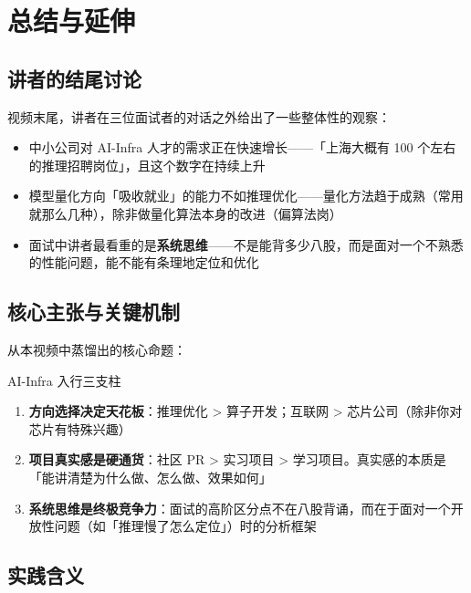 \documentclass[a4paper]{article}
\begin{document}
\section{总结与延伸}

\subsection{讲者的结尾讨论}

视频末尾，讲者在三位面试者的对话之外给出了一些整体性的观察：

\begin{itemize}
  \item 中小公司对 AI-Infra 人才的需求正在快速增长——「上海大概有 100 个左右的推理招聘岗位」，且这个数字在持续上升
  \item 模型量化方向「吸收就业」的能力不如推理优化——量化方法趋于成熟（常用就那么几种），除非做量化算法本身的改进（偏算法岗）
  \item 面试中讲者最看重的是\textbf{系统思维}——不是能背多少八股，而是面对一个不熟悉的性能问题，能不能有条理地定位和优化
\end{itemize}

\subsection{核心主张与关键机制}

从本视频中蒸馏出的核心命题：

\begin{importantbox}{AI-Infra 入行三支柱}
  \begin{enumerate}
    \item \textbf{方向选择决定天花板}：推理优化 > 算子开发；互联网 > 芯片公司（除非你对芯片有特殊兴趣）
    \item \textbf{项目真实感是硬通货}：社区 PR > 实习项目 > 学习项目。真实感的本质是「能讲清楚为什么做、怎么做、效果如何」
    \item \textbf{系统思维是终极竞争力}：面试的高阶区分点不在八股背诵，而在于面对一个开放性问题（如「推理慢了怎么定位」）时的分析框架
  \end{enumerate}
\end{importantbox}

\subsection{实践含义}
\end{document}
